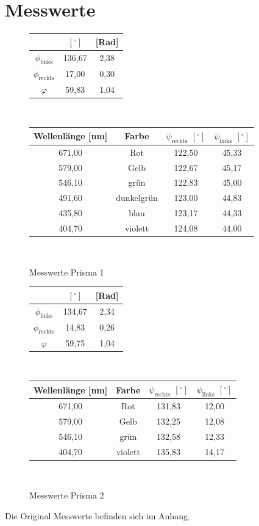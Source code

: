 \documentclass[fontsize=12pt]{scrartcl}
\begin{document}
\section{ Messwerte}
\begin{figure}[h]
\centering
\caption{Messwerte Prisma 1}
\begin{tabular}{|c|c|c|} \hline
&										$[^{\circ}]$ &	[Rad] \\ \hline
$\phi_{\text{links}}$&			136,67	&2,38		\\ \hline
$\phi_{\text{rechts}}$&		17,00	  &0,30		\\ \hline
$\varphi$	&59,83	&1,04\\ \hline
\end{tabular} \\
\begin{tabular}{|c|c|c|c|} \hline
Wellenlänge [nm] & Farbe & $\psi_{\text{rechts}}$ $[^{\circ}]$ & $\psi_{\text{links}}$ $[^{\circ}]$  \\ \hline
671,00	&Rot		&122,50	&45,33	\\ \hline
579,00	&Gelb		&122,67	&45,17	\\ \hline
546,10	&grün		&122,83	&45,00	\\ \hline
491,60	&dunkelgrün	&123,00	&44,83	\\ \hline
435,80	&blau		&123,17	&44,33	\\ \hline
404,70	&violett	&124,08	&44,00	\\ \hline
\end{tabular} \\
\end{figure}

\begin{figure}[h]
\centering
\caption{Messwerte Prisma 2}
\begin{tabular}{|c|c|c|} \hline
&							$[^{\circ}]$ &	[Rad] \\ \hline
$\phi_{\text{links}}$&		134,67		&2,34		\\ \hline
$\phi_{\text{rechts}}$&		14,83	  	&0,26		\\ \hline
$\varphi$		&			59,75		&1,04\\ \hline
\end{tabular} \\
\begin{tabular}{|c|c|c|c|} \hline
Wellenlänge [nm] & Farbe & $\psi_{\text{rechts}}$ $[^{\circ}]$ & $\psi_{\text{links}}$ $[^{\circ}]$  \\ \hline
671,00	&Rot		&131,83	&12,00	\\ \hline
579,00	&Gelb		&132,25	&12,08	\\ \hline
546,10	&grün		&132,58	&12,33	\\ \hline
404,70	&violett	&135,83	&14,17	\\ \hline
\end{tabular} \\
\end{figure}
Die Original Messwerte befinden sich im Anhang.
\newpage
\end{document}
